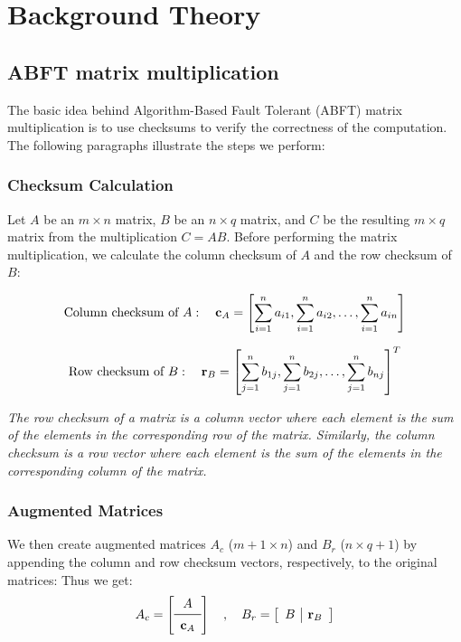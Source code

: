 \section{Background Theory}
\label{sec:background}

\subsection{ABFT matrix multiplication}

The basic idea behind Algorithm-Based Fault Tolerant (ABFT) matrix multiplication
is to use checksums to verify the correctness of the computation.
The following paragraphs illustrate the steps we perform:

\subsubsection{Checksum Calculation}
Let \( A \) be an \( m \times n \) matrix,
\( B \) be an \( n \times q \) matrix,
and \( C \) be the resulting \( m \times q \) matrix
from the multiplication \( C = A B \).
Before performing the matrix multiplication,
we calculate the column checksum of \( A \) and the row checksum of \( B \):

\[
  \textnormal{Column checksum of } A: \quad
  \mathbf{c}_A =
  \left[
    \sum_{i=1}^{n} a_{i1},
    \sum_{i=1}^{n} a_{i2},
    \ldots, \sum_{i=1}^{n} a_{in}
  \right]
\]

\[
  \textnormal{Row checksum of } B: \quad
  \mathbf{r}_B = \left[ \sum_{j=1}^{n} b_{1j}, \sum_{j=1}^{n} b_{2j}, \ldots, \sum_{j=1}^{n} b_{nj} \right]^T
\]

\textit{
  The row checksum of a matrix is a column vector where each element
  is the sum of the elements in the corresponding row of the matrix.
  Similarly, the column checksum is a row vector where
each element is the sum of the elements in the corresponding column of the matrix.}

\subsubsection{Augmented Matrices}

We then create augmented matrices $A_{c}$ (\( m+1 \times n \)) and $B_{r}$ (\( n \times q+1 \))
by appending the column and row checksum vectors, respectively, to the original matrices:
Thus we get:
\[
  A_{c} =
  \left[
    \begin{array}{c}
      A \\
      \midrule
      \mathbf{c}_A
    \end{array}
  \right]
  \quad
  ,
  \quad
  B_{r} = \left[
    \begin{array}{c|c}
      B &
      \mathbf{r}_B
    \end{array}
  \right]
\]
